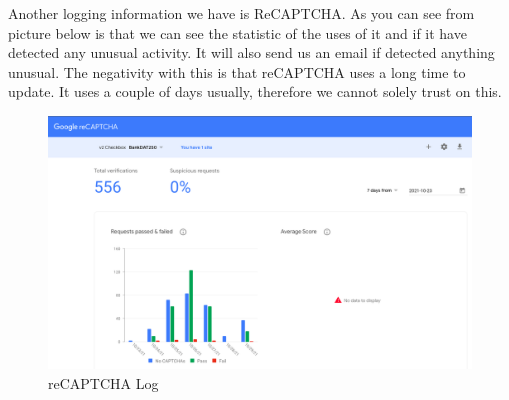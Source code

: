 Another logging information we have is ReCAPTCHA. As you can see from picture below is that we can see the statistic of the uses of it and if it have detected any unusual activity. It will also send us an email if detected anything unusual. The negativity with this is that reCAPTCHA uses a long time to update. It uses a couple of days usually, therefore we cannot solely trust on this. 

\begin{figure}[H]
    \centering
    \includegraphics[width=\textwidth]{pics/recaptchaLog.png}
    \caption{reCAPTCHA Log}
    \label{fig:cha3fig1recaptchalog}
\end{figure}
